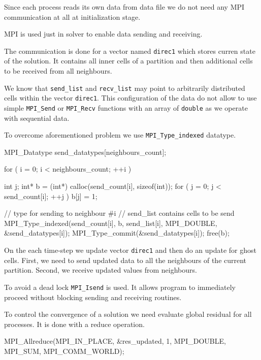\documentclass[12pt, a4paper]{article}
\begin{document}
Since each process reads its own data from data file we do not need any MPI communication at all
at initialization stage.

MPI is used just in solver to enable data sending and receiving.

The communication is done for a vector named \texttt{direc1} which stores curren state of the solution.
It contains all inner cells of a partition and then additional cells to be received from
all neighbours.

We know that \texttt{send\_list} and \texttt{recv\_list} may point to arbitrarily distributed
cells within the vector \texttt{direc1}. This configuration of the data
do not allow to use simple \texttt{MPI\_Send} or \texttt{MPI\_Recv} functions
with an array of \texttt{double} as we operate with sequential data.

To overcome aforementioned problem we use \texttt{MPI\_Type\_indexed} datatype.

\begin{cpp}
MPI_Datatype send_datatypes[neighbours_count];

for ( i = 0; i <  neighbours_count; ++i ) {
    int j;
    int* b = (int*) calloc(send_count[i], sizeof(int));
    for ( j = 0; j < send_count[i]; ++j )
        b[j] = 1;

    // type for sending to neighbour #i
    // send_list contains cells to be send
    MPI_Type_indexed(send_count[i], b, send_list[i], 
                     MPI_DOUBLE, &send_datatypes[i]);
    MPI_Type_commit(&send_datatypes[i]);
    free(b);
}
\end{cpp}


On the each time-step we update vector \texttt{direc1} and then do an update
for ghost cells. First, we need to send updated data to all the neighbours
of the current partition. Second, we receive updated values from
neighbours.

To avoid a dead lock \texttt{MPI\_Isend} is used.
It allows program to immediately proceed without blocking sending and 
receiving routines.

To control the convergence of a solution we need evaluate global residual
for all processes. It is done with a reduce operation.

\begin{cpp}
MPI_Allreduce(MPI_IN_PLACE, &res_updated, 1, 
              MPI_DOUBLE, MPI_SUM, 
              MPI_COMM_WORLD);
\end{cpp}
\end{document}
